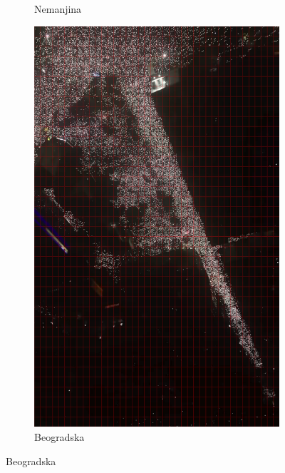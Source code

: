 \documentclass[a4paper,12pt]{article}
\begin{document}
\begin{figure}[H]
\begin{subfigure}[b]{0.3\textwidth}
	  \caption{Nemanjina}
	  \label{fig:nemanjina}
	\end{subfigure}
	\hfill
	\begin{subfigure}[b]{0.3\textwidth}
		\centering
		\includegraphics[width=\textwidth]{../grid_output/beogradska_grid.png}
		\caption{Beogradska}
		\label{fig:beogradska}
	\end{subfigure}
  
	\vspace{0.3cm} %
  

\end{figure}
\end{document}

